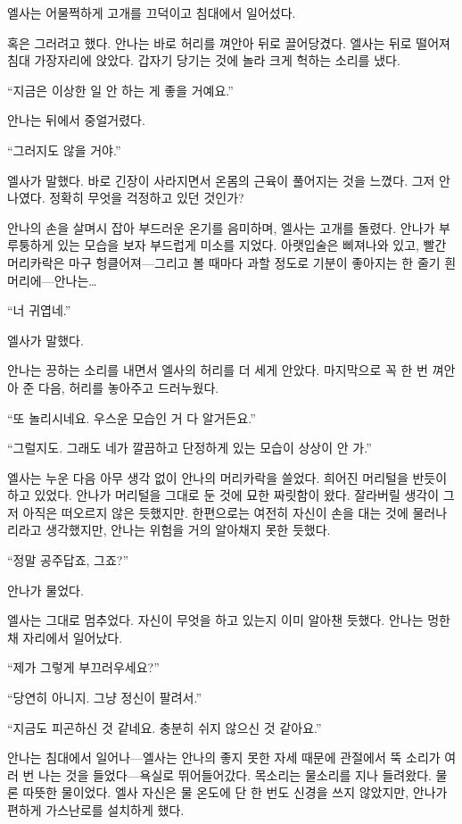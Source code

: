 엘사는 어물쩍하게 고개를 끄덕이고 침대에서 일어섰다.

혹은 그러려고 했다. 안나는 바로 허리를 껴안아 뒤로 끌어당겼다. 엘사는 뒤로 떨어져 침대 가장자리에 앉았다. 갑자기 당기는 것에 놀라 크게 헉하는 소리를 냈다.

``지금은 이상한 일 안 하는 게 좋을 거예요.''

안나는 뒤에서 중얼거렸다.

``그러지도 않을 거야.''

엘사가 말했다. 바로 긴장이 사라지면서 온몸의 근육이 풀어지는 것을 느꼈다. 그저 안나였다. 정확히 무엇을 걱정하고 있던 것인가?

안나의 손을 살며시 잡아 부드러운 온기를 음미하며, 엘사는 고개를 돌렸다. 안나가 부루퉁하게 있는 모습을 보자 부드럽게 미소를 지었다. 아랫입술은 삐져나와 있고, 빨간 머리카락은 마구 헝클어져—그리고 볼 때마다 과할 정도로 기분이 좋아지는 한 줄기 흰 머리에—안나는\ldots

``너 귀엽네.''

엘사가 말했다.

안나는 끙하는 소리를 내면서 엘사의 허리를 더 세게 안았다. 마지막으로 꼭 한 번 껴안아 준 다음, 허리를 놓아주고 드러누웠다.

``또 놀리시네요. 우스운 모습인 거 다 알거든요.''

``그럴지도. 그래도 네가 깔끔하고 단정하게 있는 모습이 상상이 안 가.''

엘사는 누운 다음 아무 생각 없이 안나의 머리카락을 쓸었다. 희어진 머리털을 반듯이 하고 있었다. 안나가 머리털을 그대로 둔 것에 묘한 짜릿함이 왔다. 잘라버릴 생각이 그저 아직은 떠오르지 않은 듯했지만. 한편으로는 여전히 자신이 손을 대는 것에 물러나리라고 생각했지만, 안나는 위험을 거의 알아채지 못한 듯했다.

``정말 공주답죠, 그죠?''

안나가 물었다.

엘사는 그대로 멈추었다. 자신이 무엇을 하고 있는지 이미 알아챈 듯했다. 안나는 멍한 채 자리에서 일어났다.

``제가 그렇게 부끄러우세요?''

``당연히 아니지. 그냥 정신이 팔려서.''

``지금도 피곤하신 것 같네요. 충분히 쉬지 않으신 것 같아요.''

안나는 침대에서 일어나—엘사는 안나의 좋지 못한 자세 때문에 관절에서 뚝 소리가 여러 번 나는 것을 들었다—욕실로 뛰어들어갔다. 목소리는 물소리를 지나 들려왔다. 물론 따뜻한 물이었다. 엘사 자신은 물 온도에 단 한 번도 신경을 쓰지 않았지만, 안나가 편하게 가스난로를 설치하게 했다.

